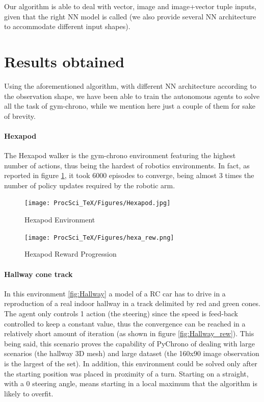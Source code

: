 \documentclass{svproc}
\begin{document}
Our algorithm is able to deal with vector, image and image+vector tuple inputs, given that the right NN model is called (we also provide several NN architecture to accommodate different input shapes).

\section{Results obtained}
Using the aforementioned algorithm, with different NN architecture according to the observation shape, we have been able to train the autonomous agents to solve all the task of gym-chrono, while we mention here just a couple of them for sake of brevity.

\paragraph{Hexapod}
The Hexapod walker is the gym-chrono environment featuring the highest number of actions, thus being the hardest of robotics environments. In fact, as reported in figure \ref{fig:Hexa_rew}, it took 6000 episodes to converge, being almost 3 times the number of policy updates required by the robotic arm.

\begin{figure}[ht]
 \begin{minipage}[b]{0.6\linewidth}
    \centering
    \texttt{[image: ProcSci\_TeX/Figures/Hexapod.jpg]}
    \caption{Hexapod Environment}
    \label{fig:Hexa}
 \end{minipage}
 \begin{minipage}[b]{0.6\linewidth}
    \centering
    \texttt{[image: ProcSci\_TeX/Figures/hexa\_rew.png]}
    \caption{Hexapod Reward Progression}
    \label{fig:Hexa_rew}
 \end{minipage}
\end{figure}

\paragraph{Hallway cone track}
In this environment \ref{fig:Hallway} a model of a RC car has to drive in a reproduction of a real indoor hallway in a track delimited by red and green cones. The agent only controls 1 action (the steering) since the speed is feed-back controlled to keep a constant value, thus the convergence can be reached in a relatively short amount of iteration (as shown in figure \ref{fig:Hallway_rew}). This being said, this scenario proves the capability of PyChrono of dealing with large scenarios (the hallway 3D mesh) and large dataset (the 160x90 image observation is the largest of the set). In addition, this environment could be solved only after the starting position was placed in proximity of a turn. Starting on a straight, with a 0 steering angle, means starting in a local maximum that the algorithm is likely to overfit. 
\end{document}
